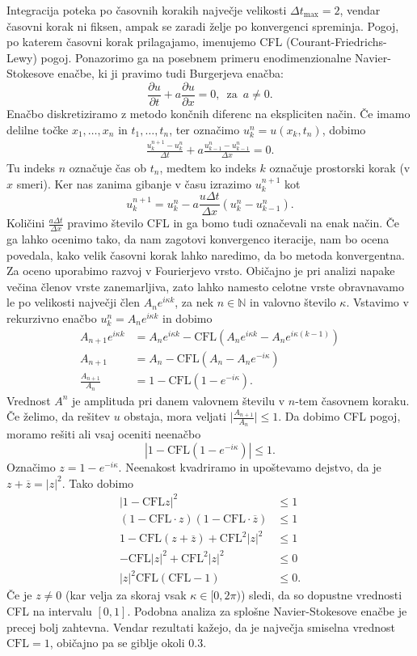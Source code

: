 \documentclass[mat2, tisk]{fmfdelo}
\begin{document}
Integracija poteka po časovnih korakih največje velikosti $\Delta t_{\text{max}} = 2$, vendar časovni 
korak ni fiksen, ampak se zaradi želje po konvergenci spreminja. Pogoj, po
katerem časovni korak prilagajamo, imenujemo 
CFL (Courant-Friedrichs-Lewy) pogoj. Ponazorimo ga na posebnem 
primeru enodimenzionalne Navier-Stokesove enačbe, ki ji pravimo 
tudi Burgerjeva enačba:
$$
\frac{\partial u}{\partial t} + a \frac{\partial u}{\partial x} = 0, \, \text{ za }\,  a \neq 0.
$$
Enačbo diskretiziramo z metodo končnih diferenc na ekspliciten način. Če imamo delilne 
točke $x_1, \dots, x_n$ in $t_1, \dots, t_n$, ter označimo $u_k^n = u(x_k, t_n)$, dobimo
\begin{align*}
\frac{u_k^{n+1} - u_k^{n}}{\Delta t} + a\frac{u_{k-1}^{n} - u_{k-1}^{n}}{\Delta x} = 0.
\end{align*}
Tu indeks $n$ označuje čas ob $t_n$, medtem ko indeks $k$ označuje prostorski korak (v $x$ smeri).
Ker nas zanima gibanje v času izrazimo $u_k^{n+1}$ kot
$$
u_k^{n+1} = u_k^{n} - a\frac{u \Delta t}{\Delta x}(u_{k}^{n} - u_{k-1}^{n}).
$$
Količini $\frac{a \Delta t}{\Delta x}$ pravimo število CFL in ga bomo 
tudi označevali na enak način. Če ga lahko ocenimo tako, da
nam zagotovi konvergenco iteracije, nam bo ocena povedala, kako velik 
časovni korak lahko naredimo, da bo metoda konvergentna.
Za oceno uporabimo razvoj v Fourierjevo vrsto. Običajno je pri analizi
napake večina členov vrste zanemarljiva, zato lahko namesto celotne 
vrste obravnavamo le po velikosti največji člen 
$A_n e^{i\kappa k}$, za nek $n\in \mathbb{N}$ in valovno število 
$\kappa$. Vstavimo v rekurzivno enačbo $u_k^n = A_n e^{i\kappa k}$ in dobimo
\begin{align*}
A_{n+1} e^{i\kappa k} &= A_n e^{i\kappa k} - \text{CFL} (A_n e^{i\kappa k} - A_n e^{i\kappa (k-1)}) \\
A_{n+1} &= A_n - \text{CFL} (A_n - A_n e^{-i\kappa}) \\ 
\frac{A_{n+1}}{A_n} &= 1 - \text{CFL}(1 - e^{-i\kappa}).
\end{align*}
Vrednost $A^n$ je amplituda pri danem valovnem številu v 
$n$-tem časovnem koraku. Če želimo, da rešitev $u$ 
obstaja, mora veljati $\Big|\frac{A_{n+1}}{A_n}\Big| \leq 1$. 
Da dobimo CFL pogoj, moramo rešiti ali vsaj oceniti neenačbo 
$$
|1 - \text{CFL}(1 - e^{-i\kappa})| \leq 1. 
$$
Označimo $z = 1 - e^{-i\kappa}$. Neenakost kvadriramo in upoštevamo dejstvo, da je 
$z+\overline{z} = |z|^2$. Tako dobimo
\begin{align*}
  |1 - \text{CFL} z|^2 &\leq 1 \\
  (1 - \text{CFL}\cdot z)(1- \text{CFL}\cdot \overline{z}) &\leq 1 \\
  1 - \text{CFL}(z + \overline{z}) + \text{CFL}^2 |z|^2 &\leq 1 \\
  - \text{CFL}|z|^2 + \text{CFL}^2 |z|^2 &\leq 0 \\
  |z|^2 \text{CFL}(\text{CFL} - 1)&\leq 0.
\end{align*}
Če je $z \neq 0$ (kar velja za skoraj vsak $\kappa \in [0, 2\pi)$) sledi, da 
so dopustne vrednosti CFL na intervalu $[0, 1]$. Podobna analiza 
za splošne Navier-Stokesove enačbe je precej bolj zahtevna. Vendar rezultati
kažejo, da je največja smiselna vrednost $\text{CFL} = 1$, običajno pa se giblje okoli $0.3$.
\end{document}
